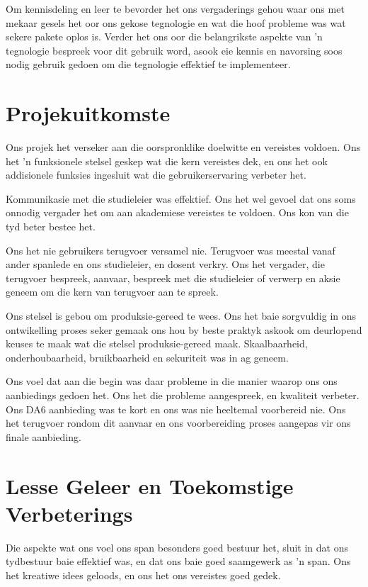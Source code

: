 Om kennisdeling en leer te bevorder het ons vergaderings gehou waar ons met
mekaar gesels het oor ons gekose tegnologie en wat die hoof probleme was wat
sekere pakete oplos is. Verder het ons oor die belangrikste aspekte van 'n
tegnologie bespreek voor dit gebruik word, asook eie kennis en navorsing soos
nodig gebruik gedoen om die tegnologie effektief te implementeer.

\section{Projekuitkomste}

Ons projek het verseker aan die oorspronklike doelwitte en vereistes voldoen.
Ons het 'n funksionele stelsel geskep wat die kern vereistes dek, en ons het
ook addisionele funksies ingesluit wat die gebruikerservaring verbeter het.

Kommunikasie met die studieleier was effektief. Ons het wel gevoel dat ons soms
onnodig vergader het om aan akademiese vereistes te voldoen. Ons kon van die tyd beter bestee het.

Ons het nie gebruikers terugvoer versamel nie. Terugvoer was meestal vanaf ander
spanlede en ons studieleier, en dosent verkry. Ons het vergader, die terugvoer
bespreek, aanvaar, bespreek met die studieleier of verwerp en aksie geneem om
die kern van terugvoer aan te spreek.

Ons stelsel is gebou om produksie-gereed te wees. Ons het baie sorgvuldig in ons
ontwikelling proses seker gemaak ons hou by beste praktyk askook om deurlopend
keuses te maak wat die stelsel produksie-gereed maak. Skaalbaarheid,
onderhoubaarheid, bruikbaarheid en sekuriteit was in ag geneem.

Ons voel dat aan die begin was daar probleme in die manier waarop ons ons
aanbiedings gedoen het. Ons het die probleme aangespreek, en kwaliteit verbeter.
Ons DA6 aanbieding was te kort en ons was nie heeltemal voorbereid nie. Ons
het terugvoer rondom dit aanvaar en ons voorbereiding proses aangepas vir ons
finale aanbieding.

\section{Lesse Geleer en Toekomstige Verbeterings}

Die aspekte wat ons voel ons span besonders goed bestuur het, sluit in dat ons
tydbestuur baie effektief was, en dat ons baie goed saamgewerk as 'n span. Ons het kreatiwe idees geloods, en ons het ons vereistes goed gedek.

